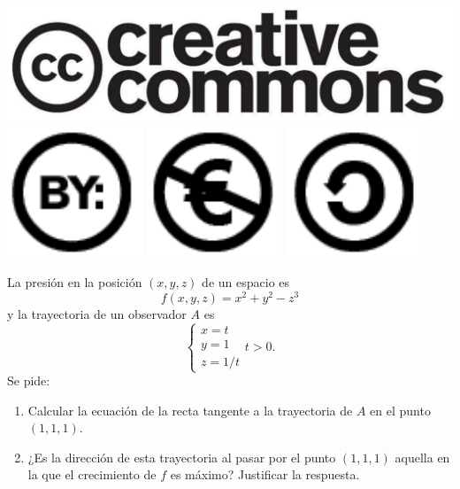 \documentclass[aspectratio=149,10pt,xcolor=dvipsnames,t]{beamer}
\begin{document}
\begin{frame}[c]
\begin{center}
\biskip
\includegraphics[scale=0.07]{img/cc-logo}
\includegraphics[scale=0.2]{img/cc-by}
\includegraphics[scale=0.2]{img/cc-e}
\includegraphics[scale=0.2]{img/cc-c}\end{center}
\end{frame}

\begin{frame}[c]
La presión en la posición $(x,y,z)$ de un espacio es 
\[
f(x,y,z)= x^2+y^2-z^3
\]
y la trayectoria de un observador $A$ es 
\[
\begin{cases}
x=t\\
y=1\\
z=1/t
\end{cases}
t>0.
\]
Se pide:
\begin{enumerate}
\item Calcular la ecuación de la recta tangente a la trayectoria de $A$ en el punto $(1,1,1)$.
\item ¿Es la dirección de esta trayectoria al pasar por el punto $(1,1,1)$ aquella en la que el crecimiento de $f$
es máximo? 
Justificar la respuesta. 
\end{enumerate}
\end{frame}
\end{document}
